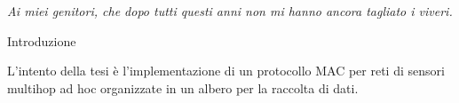 \documentclass[twoside,11pt,a4paper,italian,openany]{book}
\begin{document}
\frontmatter
\newlength{\centeroffset}
\setlength{\centeroffset}{-0.5\oddsidemargin}
\addtolength{\centeroffset}{0.5\evensidemargin}
\thispagestyle{empty}
\noindent\hspace*{\centeroffset}


\pagestyle{fancy}

\renewcommand{\chaptermark}[1]{\markboth{#1}{}}
\renewcommand{\sectionmark}[1]{\markright{\thesection\ #1}}
\fancyhf{} %
\fancyhead[LE,RO]{\bfseries\thepage}
\fancyhead[LO]{\bfseries\rightmark}
\fancyhead[RE]{\bfseries\leftmark}
\renewcommand{\headrulewidth}{0.5pt}
\renewcommand{\footrulewidth}{0pt}
\addtolength{\headheight}{0.5pt} %
\fancypagestyle{plain}{%
    \fancyhead{} %
    \renewcommand{\headrulewidth}{0pt} %
}
\newcommand{\sink}[0]{\emph{Sink}}
\newcommand{\ack}[0]{\texttt{ACK}}

\newcommand{\req}[0]{\texttt{REQ}}
\newcommand{\nesc}[0]{\texttt{NesC}}
\clearpage
\null{}
\begin{flushright}
 \emph{Ai miei genitori, che dopo tutti questi anni
       non mi hanno ancora tagliato i viveri.}
\end{flushright}
\mainmatter


\begin{center}
\large{Introduzione}
\end{center}
\vspace{0.3in}
\hspace{\parindent}
L'intento della tesi è l'implementazione di un protocollo MAC per reti di sensori 
multihop ad hoc organizzate in un albero per la raccolta di dati.
\end{document}
